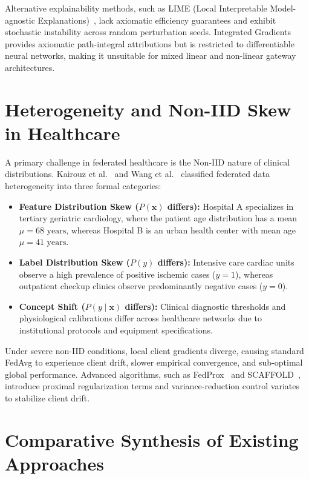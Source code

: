 \documentclass[12pt,a4paper,oneside]{report}
\begin{document}
Alternative explainability methods, such as LIME (Local Interpretable Model-agnostic Explanations)~\cite{ribeiro2016why}, lack axiomatic efficiency guarantees and exhibit stochastic instability across random perturbation seeds. Integrated Gradients~\cite{sundararajan2017axiomatic} provides axiomatic path-integral attributions but is restricted to differentiable neural networks, making it unsuitable for mixed linear and non-linear gateway architectures.

\section{Heterogeneity and Non-IID Skew in Healthcare}
A primary challenge in federated healthcare is the Non-IID nature of clinical distributions. Kairouz et al.~\cite{kairouz2021advances} and Wang et al.~\cite{wang2021field} classified federated data heterogeneity into three formal categories:
\begin{itemize}
    \item \textbf{Feature Distribution Skew ($P(\mathbf{x})$ differs):} Hospital A specializes in tertiary geriatric cardiology, where the patient age distribution has a mean $\mu = 68\text{ years}$, whereas Hospital B is an urban health center with mean age $\mu = 41\text{ years}$.
    \item \textbf{Label Distribution Skew ($P(y)$ differs):} Intensive care cardiac units observe a high prevalence of positive ischemic cases ($y=1$), whereas outpatient checkup clinics observe predominantly negative cases ($y=0$).
    \item \textbf{Concept Shift ($P(y \mid \mathbf{x})$ differs):} Clinical diagnostic thresholds and physiological calibrations differ across healthcare networks due to institutional protocols and equipment specifications.
\end{itemize}
Under severe non-IID conditions, local client gradients diverge, causing standard FedAvg to experience client drift, slower empirical convergence, and sub-optimal global performance. Advanced algorithms, such as FedProx~\cite{li2020federated} and SCAFFOLD~\cite{karimireddy2020scaffold}, introduce proximal regularization terms and variance-reduction control variates to stabilize client drift.

\section{Comparative Synthesis of Existing Approaches}
\end{document}
